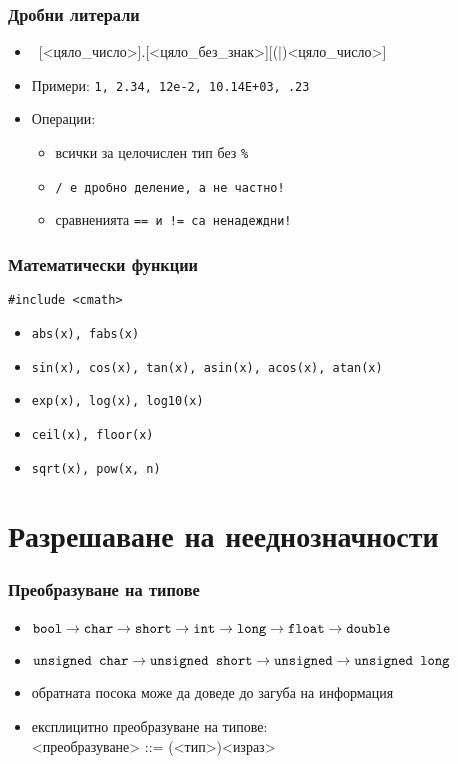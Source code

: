 \documentclass[alsotrans]{beamerswitch}
\begin{document}
\begin{frame}
  \frametitle{Дробни литерали}
  \begin{itemize}
  \item\ [<цяло\_число>]\tta.[<цяло\_без\_знак>][(|)<цяло\_число>]
  \item Примери: \tt1, \tt{2.34}, \tt{12e-2}, \tt{10.14E+03}, \tt{.23}
  \item Операции:
    \begin{itemize}
    \item всички за целочислен тип \alert{без \tt\%}
    \item \tt/ е \alert{дробно деление}, а не частно!
    \item сравненията \tt{==} и \tt{!=} са \alert{ненадеждни}!
    \end{itemize}
  \end{itemize}
\end{frame}


\begin{frame}[fragile]
  \frametitle{Математически функции}
  \lstinline{#include <cmath>}
  \begin{itemize}
  \item \tt{abs(x)}, \tt{fabs(x)}
  \item \tt{sin(x)}, \tt{cos(x)}, \tt{tan(x)}, \tt{asin(x)}, \tt{acos(x)}, \tt{atan(x)}
  \item \tt{exp(x)}, \tt{log(x)}, \tt{log10(x)}
  \item \tt{ceil(x)}, \tt{floor(x)}
  \item \tt{sqrt(x)}, \tt{pow(x, n)}
  \end{itemize}
\end{frame}

\section{Разрешаване на нееднозначности}

\begin{frame}
  \frametitle{Преобразуване на типове}
  \begin{itemize}
  \item $\tt{bool}\rightarrow%
    \tt{char}\rightarrow%
    \tt{short}\rightarrow%
    \tt{int}\rightarrow%
    \tt{long}\rightarrow%
    \tt{float}\rightarrow%
    \tt{double}$
  \item $\tt{unsigned char}\rightarrow%
    \tt{unsigned short}\rightarrow%
    \tt{unsigned}\rightarrow%
    \tt{unsigned long}$
  \item обратната посока може да доведе до \alert{загуба на информация}
  \item експлицитно преобразуване на типове:\\
    <преобразуване> ::= \tta(<тип>\tta)<израз>
  \end{itemize}
\end{frame}
\end{document}
